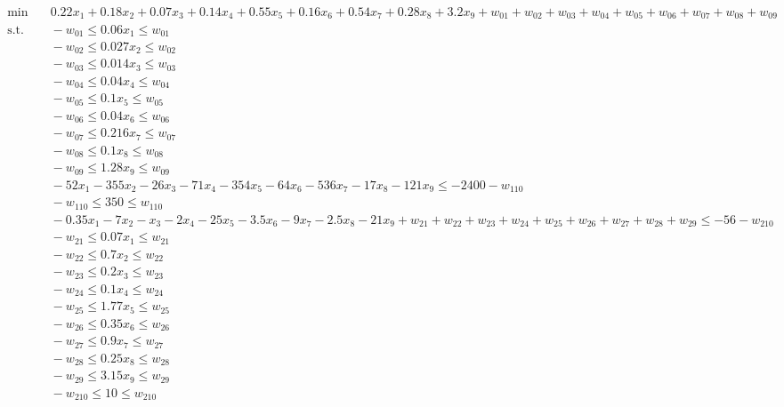 \documentclass[a4paper,12pt]{article}
\begin{document}
\begin{adjustwidth}{-1.5cm}{}
\begin{tiny}
\setlength{\jot}{0pt}
\[
\begin{aligned}
   \begin{aligned}
    \min & \quad  0.22x_1 + 0.18x_2 + 0.07x_3 + 0.14x_4 + 0.55x_5 + 0.16x_6 + 0.54x_7 + 0.28x_8 + 3.2x_9 + w_{01} + w_{02} + w_{03} + w_{04} + w_{05} + w_{06} + w_{07}+ w_{08}+ w_{09} \\
    \text{s.t.} & \quad -w_{01} \leq 0.06x_1 \leq w_{01} \\
    & \quad -w_{02} \leq 0.027x_2 \leq w_{02} \\
    & \quad -w_{03} \leq 0.014x_3 \leq w_{03} \\
    & \quad -w_{04} \leq 0.04x_4 \leq w_{04} \\
    & \quad -w_{05} \leq 0.1x_5 \leq w_{05} \\
    & \quad -w_{06} \leq 0.04x_6 \leq w_{06} \\
    & \quad -w_{07} \leq 0.216x_7 \leq w_{07} \\
    & \quad -w_{08} \leq 0.1x_8 \leq w_{08} \\
    & \quad -w_{09} \leq 1.28x_9 \leq w_{09} \\
    & \quad -52x_1-355x_2-26x_3-71x_4-354x_5-64x_6-536x_7-17x_8-121x_9 \leq -2400 - w_{110}\\
    & \quad -w_{110} \leq 350 \leq w_{110} \\
    & \quad -0.35x_1 - 7x_2 - x_3 - 2x_4 - 25x_5 - 3.5x_6 - 9x_7 - 2.5x_8 - 21x_9 + w_{21} + w_{22} + w_{23} + w_{24} + w_{25} + w_{26} + w_{27}+ w_{28}+ w_{29} \leq -56 - w_{210} \\
    & \quad -w_{21} \leq 0.07x_1 \leq w_{21} \\
    & \quad -w_{22} \leq 0.7x_2 \leq w_{22} \\
    & \quad -w_{23} \leq 0.2x_3 \leq w_{23} \\
    & \quad -w_{24} \leq 0.1x_4 \leq w_{24} \\
    & \quad -w_{25} \leq 1.77x_5 \leq w_{25} \\
    & \quad -w_{26} \leq 0.35x_6 \leq w_{26} \\
    & \quad -w_{27} \leq 0.9x_7 \leq w_{27} \\
    & \quad -w_{28} \leq 0.25x_8 \leq w_{28} \\
    & \quad -w_{29} \leq 3.15x_9 \leq w_{29} \\
    & \quad -w_{210} \leq 10 \leq w_{210} \\

\end{aligned}
\end{aligned}\]
\end{tiny}
\end{adjustwidth}
\end{document}
